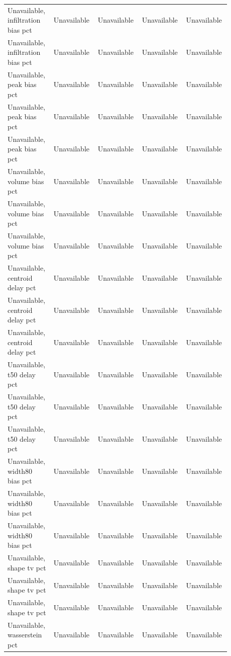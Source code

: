 \begin{longtable}{p{0.1760\linewidth}p{0.1760\linewidth}p{0.1760\linewidth}p{0.1760\linewidth}p{0.1760\linewidth}}
Unavailable, infiltration bias pct & Unavailable & Unavailable & Unavailable & Unavailable \\
Unavailable, infiltration bias pct & Unavailable & Unavailable & Unavailable & Unavailable \\
Unavailable, peak bias pct & Unavailable & Unavailable & Unavailable & Unavailable \\
Unavailable, peak bias pct & Unavailable & Unavailable & Unavailable & Unavailable \\
Unavailable, peak bias pct & Unavailable & Unavailable & Unavailable & Unavailable \\
Unavailable, volume bias pct & Unavailable & Unavailable & Unavailable & Unavailable \\
Unavailable, volume bias pct & Unavailable & Unavailable & Unavailable & Unavailable \\
Unavailable, volume bias pct & Unavailable & Unavailable & Unavailable & Unavailable \\
Unavailable, centroid delay pct & Unavailable & Unavailable & Unavailable & Unavailable \\
Unavailable, centroid delay pct & Unavailable & Unavailable & Unavailable & Unavailable \\
Unavailable, centroid delay pct & Unavailable & Unavailable & Unavailable & Unavailable \\
Unavailable, t50 delay pct & Unavailable & Unavailable & Unavailable & Unavailable \\
Unavailable, t50 delay pct & Unavailable & Unavailable & Unavailable & Unavailable \\
Unavailable, t50 delay pct & Unavailable & Unavailable & Unavailable & Unavailable \\
Unavailable, width80 bias pct & Unavailable & Unavailable & Unavailable & Unavailable \\
Unavailable, width80 bias pct & Unavailable & Unavailable & Unavailable & Unavailable \\
Unavailable, width80 bias pct & Unavailable & Unavailable & Unavailable & Unavailable \\
Unavailable, shape tv pct & Unavailable & Unavailable & Unavailable & Unavailable \\
Unavailable, shape tv pct & Unavailable & Unavailable & Unavailable & Unavailable \\
Unavailable, shape tv pct & Unavailable & Unavailable & Unavailable & Unavailable \\
Unavailable, wasserstein pct & Unavailable & Unavailable & Unavailable & Unavailable \\

\end{longtable}
